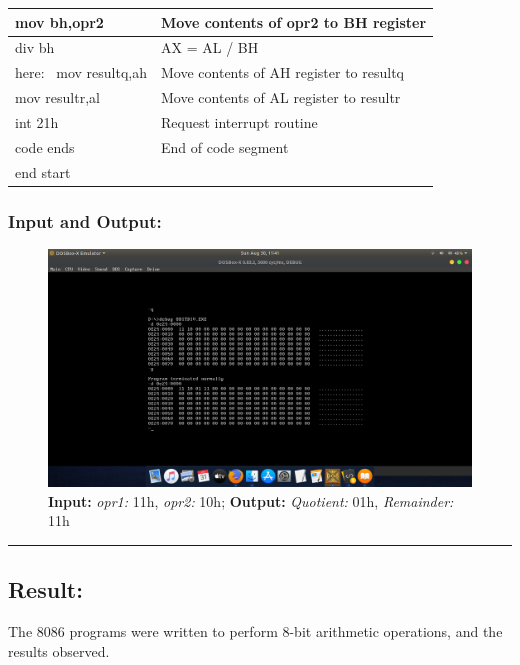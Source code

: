 \documentclass[12pt,a4paper]{article}
\begin{document}
\begin{flushleft}
\begin{table}[h]
{\begin{tabular}{|l|l|}
\hline
mov bh,opr2                                                      & Move contents of opr2 to BH register          \\ 
\hline
div bh                                                           & AX = AL / BH                                  \\ 
\hline
here:~ mov resultq,ah                                            & Move contents of AH register to resultq       \\ 
\hline
mov resultr,al                                                   & Move contents of AL register to resultr       \\ 
\hline
int 21h                                                          & Request interrupt routine                     \\ 
\hline
code ends                                                        & End of code segment                           \\
\hline
end start                                                        &                                               \\
\hline
\end{tabular}
}
\end{table}

\newpage
\subsubsection*{\textbf{Input and Output:}}
\begin{figure}[h]
    \centering
    \includegraphics[trim = 100mm 70mm 100mm 80mm, clip, width = \textwidth]{Division.png}
    \caption{ \textbf{Input:} \emph{opr1:} 11h, \emph{opr2:} 10h; 
              \textbf{Output:} \emph{Quotient:} 01h, \emph{Remainder:} 11h}
\end{figure}

\hrule
\subsection*{\textbf{Result:}}
The 8086 programs were written to perform 8-bit arithmetic operations, and the results observed.
\end{flushleft}
\end{document}
